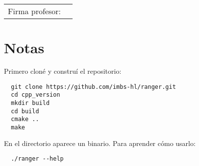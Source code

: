 \documentclass[12pt,oneside]{book}
\begin{document}
  \vfill

  \begin{tabular}{p{3 cm} p{10 cm}}
    Firma profesor: & \\
    \cline{2-2}
  \end{tabular}

  \newpage

  \section{Notas}

Primero cloné y construí el repositorio:
\begin{lstlisting}
  git clone https://github.com/imbs-hl/ranger.git
  cd cpp_version
  mkdir build
  cd build
  cmake ..
  make \end{lstlisting}

En el directorio aparece un binario.
Para aprender cómo usarlo:
\begin{lstlisting}
  ./ranger --help \end{lstlisting}
  
\end{document}
